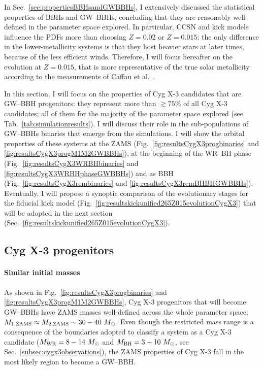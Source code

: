 \documentclass[a4paper,titlepage]{book}     	%
\newcommand{\sun}{\ensuremath{_\odot}}
\newcommand{\msun}{\ensuremath{M\sun}}
\begin{document}
In Sec.\ \ref{sec:propertiesBBHsandGWBBHs}, I extensively discussed the statistical properties of BBHs and GW--BBHs, concluding that they are reasonably well-defined in the parameter space explored. In particular, CCSN and kick models influence the PDFs more than choosing $Z=0.02$ or $Z=0.015$: the only difference in the lower-metallicity systems is that they host heavier stars at later times, because of the less efficient winds. Therefore, I will focus hereafter on the evolution at $Z=0.015$, that is more representative of the true solar metallicity according to the measurements of Caffau et al.\ \cite{caffau2011solarmetallicity}.

In this section, I will focus on the properties of Cyg X-3 candidates that are GW--BBH progenitors: they represent more than $\gtrsim 75\%$ of all Cyg X-3 candidates; all of them for the majority of the parameter space explored (see Tab.\ \ref{tab:simulationresults}). I will discuss their role in the sub-populations of GW--BBHs binaries that emerge from the simulations. I will show the orbital properties of these systems at the ZAMS (Fig.\ \ref{fig:resultsCygX3progbinaries} and \ref{fig:resultsCygX3progM1M2GWBBHs}), at the beginning of the WR--BH phase (Fig.\ \ref{fig:resultsCygX3WRBHbinaries} and \ref{fig:resultsCygX3WRBHphaseGWBBHs}) and as BBH (Fig.\ \ref{fig:resultsCygX3rembinaries} and \ref{fig:resultsCygX3remBHBHGWBBHs}). Eventually, I will propose a synoptic comparison of the evolutionary stages for the fiducial kick model (Fig.\ \ref{fig:resultskickunified265Z015evolutionCygX3}) that will be adopted in the next section (Sec.\ \ref{fig:resultskickunified265Z015evolutionCygX3}). 




\subsection{Cyg X-3 progenitors}\label{subsec:ProgenitorsCygX3vsGWBBHs}
\paragraph{Similar initial masses} As shown in Fig.\ \ref{fig:resultsCygX3progbinaries} and \ref{fig:resultsCygX3progM1M2GWBBHs}, Cyg X-3 progenitors that will become GW--BBHs have ZAMS masses well-defined across the whole parameter space: $M_{\rm 1, ZAMS} \approx M_{\rm 2, ZAMS} \sim 30-40~\msun$. Even though the restricted mass range is a consequence of the boundaries adopted to classify a system as a Cyg X-3 candidate ($M_{\rm WR} = 8-14~\msun$ and $M_{\rm BH}=3-10~\msun$, see Sec.\ \ref{subsec:cygx3observations}), the ZAMS properties of Cyg X-3 fall in the most likely region to become a GW--BBH.
\end{document}
